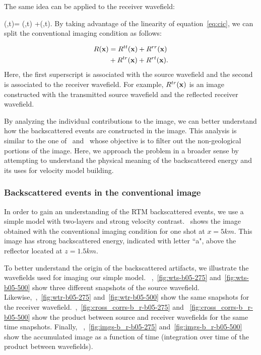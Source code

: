 The same idea can be applied to the receiver wavefield:

\beq
\UR(\xx,t)= \URr(\xx,t) +\URt(\xx,t).
\label{eq:rsplit}
\eeq
%
By taking advantage of the linearity of equation~\ref{eq:cic},  we
can split the conventional imaging condition as follows:

\begin{align}
\nonumber R({\bf x}) &= R^{tt}({\bf x}) +R^{rr}({\bf x})\\
             &+ R^{tr}({\bf x})+ R^{rt}({\bf x}).
\label{eq:cicsplit}
\end{align}
%
Here, the first superscript is associated with the source wavefield and the second is associated to the
receiver wavefield. For example, $R^{tr}({\bf x})$ is an image constructed with the transmitted source wavefield
and the reflected receiver wavefield.

By analyzing the individual contributions to the image, we can better understand how the backscattered events
are constructed in the image. This analysis is similar to the one of~\cite{fei:3130} and~\cite{liu:S29}
whose objective is to filter out the non-geological portions of the image. Here, we approach the problem 
in a broader sense by attempting to understand the physical meaning of the backscattered energy and its
uses for velocity model building.


\subsubsection{Backscattered events in the conventional image}

In order to gain an understanding of the RTM backscattered events, we use a simple model with two-layers and strong velocity
contrast.~ shows the image obtained with the conventional imaging condition for one shot at $x=5km$. This image has strong 
backscattered energy, indicated with letter ``a", above the reflector located at $z=1.5km$.

To better understand the origin of the backscattered artifacts, we illustrate the wavefields used for imaging our simple model.
~,~\ref{fig:wts-b05-275} and~\ref{fig:wts-b05-500} show three different snapshots
of the source wavefield. Likewise,~,~\ref{fig:wtr-b05-275} and~\ref{fig:wtr-b05-500}
show the same snapshots for the receiver wavefield.~,~\ref{fig:cross_corrs-b_r-b05-275} and
~\ref{fig:cross_corrs-b_r-b05-500} show the product between source and receiver wavefields for the same time snapshots. Finally,
~,~\ref{fig:imgs-b_r-b05-275} and~\ref{fig:imgs-b_r-b05-500} show the accumulated image as a function of time (integration over time of 
the product between wavefields).

